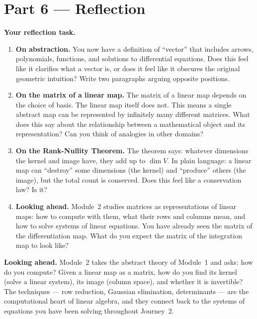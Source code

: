 \documentclass[12pt, a4paper]{article}
\begin{document}
\section{Part 6 \texorpdfstring{---}{--} Reflection}

\begin{reflectionbox}
\textbf{Your reflection task.}

\begin{enumerate}
  \item \textbf{On abstraction.} You now have a definition of ``vector'' that includes arrows, polynomials, functions, and solutions to differential equations. Does this feel like it clarifies what a vector is, or does it feel like it obscures the original geometric intuition? Write two paragraphs arguing opposite positions.

  \item \textbf{On the matrix of a linear map.} The matrix of a linear map depends on the choice of basis. The linear map itself does not. This means a single abstract map can be represented by infinitely many different matrices. What does this say about the relationship between a mathematical object and its representation? Can you think of analogies in other domains?

  \item \textbf{On the Rank-Nullity Theorem.} The theorem says: whatever dimensions the kernel and image have, they add up to $\dim V$. In plain language: a linear map can ``destroy'' some dimensions (the kernel) and ``produce'' others (the image), but the total count is conserved. Does this feel like a conservation law? Is it?

  \item \textbf{Looking ahead.} Module~2 studies matrices as representations of linear maps: how to compute with them, what their rows and columns mean, and how to solve systems of linear equations. You have already seen the matrix of the differentiation map. What do you expect the matrix of the integration map to look like?
\end{enumerate}
\end{reflectionbox}

\medskip
\noindent\textbf{Looking ahead.}
Module~2 takes the abstract theory of Module~1 and asks: how do you compute? Given a linear map as a matrix, how do you find its kernel (solve a linear system), its image (column space), and whether it is invertible? The techniques --- row reduction, Gaussian elimination, determinants --- are the computational heart of linear algebra, and they connect back to the systems of equations you have been solving throughout Journey~2.
\end{document}
